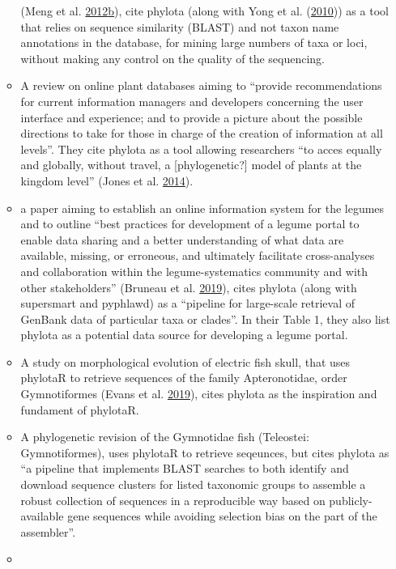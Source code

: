 \documentclass[]{article}
\begin{document}
\begin{enumerate}
\begin{itemize}
    (Meng et al. \protect\hyperlink{ref-meng2012cloud}{2012}\protect\hyperlink{ref-meng2012cloud}{b}), cite phylota (along with Yong et al. (\protect\hyperlink{ref-yong2010screening}{2010})) as a tool that relies on sequence
    similarity (BLAST) and not taxon name annotations in the database, for mining
    large numbers of taxa or loci, without making any control on the quality of the
    sequencing.
  \item
    A review on online plant databases aiming to ``provide recommendations for current
    information managers and developers concerning the user interface and experience;
    and to provide a picture about the possible directions to take for those in charge
    of the creation of information at all levels''. They cite phylota as a tool allowing
    researchers ``to acces equally and globally, without travel, a {[}phylogenetic?{]} model
    of plants at the kingdom level'' (Jones et al. \protect\hyperlink{ref-jones2014trends}{2014}).
  \item
    a paper aiming to establish an online information system for the legumes and
    to outline ``best practices for development of a legume portal to enable data
    sharing and a better understanding of what data are available, missing, or erroneous,
    and ultimately facilitate cross-analyses and collaboration within the legume-systematics
    community and with other stakeholders'' (Bruneau et al. \protect\hyperlink{ref-bruneau2019towards}{2019}), cites phylota (along with supersmart and pyphlawd) as a
    ``pipeline for large-scale retrieval of GenBank data of particular taxa or clades''.
    In their Table 1, they also list phylota as a potential data source for developing a legume portal.
  \item
    A study on morphological evolution of electric fish skull, that uses phylotaR
    to retrieve sequences of the family Apteronotidae, order Gymnotiformes (Evans et al. \protect\hyperlink{ref-evans2019bony}{2019}),
    cites phylota as the inspiration and fundament of phylotaR.
  \item
    A phylogenetic revision of the Gymnotidae fish (Teleostei: Gymnotiformes),
    uses phylotaR to retrieve seqeunces, but cites phylota as ``a pipeline that implements
    BLAST searches to both identify and download sequence clusters for listed taxonomic
    groups to assemble a robust collection of sequences in a reproducible way based
    on publicly-available gene sequences while avoiding selection bias on the part
    of the assembler''.
  \item

\end{itemize}
\end{enumerate}
\end{document}
